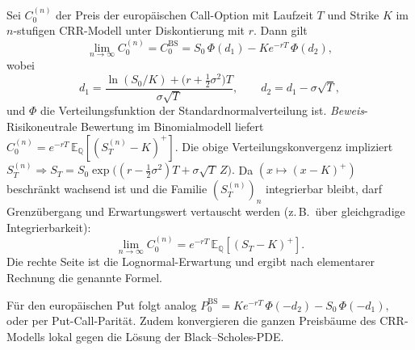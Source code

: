 \begin{satz}
Sei $C_0^{(n)}$ der Preis der europäischen Call-Option mit Laufzeit $T$ und Strike $K$
im $n$-stufigen CRR-Modell unter Diskontierung mit $r$. Dann gilt
\[
\lim_{n\to\infty} C_0^{(n)}
= C_0^{\mathrm{BS}}
= S_0\,\Phi(d_1) - K e^{-rT}\,\Phi(d_2),
\]
wobei
\[
d_1 = \frac{\ln(S_0/K) + \big(r + \tfrac12 \sigma^2\big)T}{\sigma \sqrt{T}},
\qquad
d_2 = d_1 - \sigma \sqrt{T},
\]
und $\Phi$ die Verteilungsfunktion der Standardnormalverteilung ist.
\textit{Beweis}-
Risikoneutrale Bewertung im Binomialmodell liefert
$
C_0^{(n)} = e^{-rT}\,\mathbb E_{\mathbb Q}\!\left[(S_T^{(n)} - K)^+\right].
$
Die obige Verteilungskonvergenz impliziert
$
S_T^{(n)} \Rightarrow S_T = S_0 \exp\!\big((r-\tfrac12\sigma^2)T + \sigma \sqrt{T}\,Z\big).
$
Da $(x\mapsto (x-K)^+)$ beschränkt wachsend ist und die Familie $(S_T^{(n)})_n$ integrierbar bleibt,
darf Grenzübergang und Erwartungswert vertauscht werden (z.\,B.\ über gleichgradige Integrierbarkeit):
\[
\lim_{n\to\infty} C_0^{(n)} = e^{-rT}\,\mathbb E_{\mathbb Q}\!\left[(S_T - K)^+\right].
\]
Die rechte Seite ist die Lognormal-Erwartung und ergibt nach elementarer Rechnung die genannte Formel.
\end{satz}

\begin{bem}
Für den europäischen Put folgt analog
$
P_0^{\mathrm{BS}} = K e^{-rT}\,\Phi(-d_2) - S_0\,\Phi(-d_1),
$
oder per Put-Call-Parität. Zudem konvergieren die ganzen Preisbäume des CRR-Modells lokal gegen die Lösung der Black–Scholes-PDE.
\end{bem}